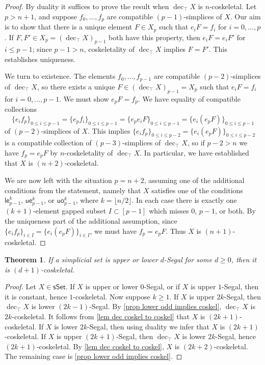 \documentclass{amsart}
\newcommand{\lowev}{\mathsf{le}}
\newcommand{\uppev}{\mathsf{ue}}
\newcommand{\uppod}{\mathsf{uo}}
\newcommand{\sset}{\mathsf{sSet}}
\newcommand{\dectop}{\operatorname{dec}_\top}
\newtheorem{theorem}{Theorem}
\theoremstyle{definition}
\theoremstyle{remark}
\begin{document}
\begin{proof}
By duality it suffices to prove the result when $\dectop X$ is $n$-coskeletal. 
Let $p > n+1$, and suppose $f_0, \dots, f_p$ are compatible $(p-1)$-simplices of $X$.
Our aim is to show that there is a unique element $F\in X_p$ such that $e_i F = f_i$ for $i=0,\dots, p$.
If $F,F' \in X_p = (\dectop X)_{p-1}$ both have this property, then $e_i F = e_i F'$ for $i \leq p-1$; since $p-1 > n$, coskeletality of $\dectop X$ implies $F = F'$. This establishes uniqueness.

We turn to existence.
The elements $f_0, \dots, f_{p-1}$ are compatible $(p{-}2)$-simplices of $\dectop X$, so there exists a unique $F \in (\dectop X)_{p-1} = X_p$ such that $e_i F = f_i$ for $i=0, \dots, p-1$.
We must show $e_p F = f_p$.
We have equality of compatible collections
\[
	\{ e_i f_p \}_{0 \leq i \leq p-1} = \{ e_p f_i \}_{0 \leq i \leq p-1} = \{ e_p e_i F \}_{0 \leq i \leq p-1} = \{ e_i (e_p F) \}_{0 \leq i \leq p-1}
\]
of $(p-2)$-simplices of $X$.
This implies $\{ e_i f_p \}_{0 \leq i \leq p-2} = \{ e_i (e_p F) \}_{0 \leq i \leq p-2}$ is a compatible collection of $(p-3)$-simplices of $\dectop X$, so if $p-2 > n$ we have $f_p = e_p F$ by $n$-coskeletality of $\dectop X$.
In particular, we have established that $X$ is $(n{+}2)$-coskeletal.

We are now left with the situation $p=n+2$, assuming one of the additional conditions from the statement, namely that $X$ satisfies one of the conditions $\lowev^k_{p-1}$, $\uppev^k_{p-1}$, or $\uppod^k_{p-1}$, where $k= \lfloor n/2 \rfloor$.
In each case there is exactly one $(k+1)$-element gapped subset $I\subset [p-1]$ which misses $0$,  $p-1$, or both.
By the uniqueness part of the additional assumption, since $\{ e_i f_p \}_{i\in I} = \{ e_i (e_p F) \}_{i\in I}$, we must have $f_p = e_p F$.
Thus $X$ is $(n{+}1)$-coskeletal.
\end{proof}


\begin{theorem}\label{hsc implies coskel}
If a simplicial set is upper or lower $d$-Segal for some $d\geq 0$, then it is $(d{+}1)$-coskeletal.
\end{theorem}
\begin{proof}
Let $X\in \sset$.
If $X$ is upper or lower $0$-Segal, or if $X$ is upper $1$-Segal, then it is constant, hence $1$-coskeletal.
Now suppose $k \geq 1$.
If $X$ is upper $2k$-Segal, then $\dectop X$ is lower $(2k{-}1)$-Segal.
By \cref{prop lower odd implies coskel}, $\dectop X$ is $2k$-coskeletal.
It follows from \cref{lem dec coskel to coskel} that $X$ is $(2k{+}1)$-coskeletal.
If $X$ is lower $2k$-Segal, then using duality we infer that $X$ is $(2k{+}1)$-coskeletal.
If $X$ is upper $(2k{+}1)$-Segal, then $\dectop X$ is lower $2k$-Segal, hence $(2k{+}1)$-coskeletal.
By \cref{lem dec coskel to coskel}, $X$ is $(2k{+}2)$-coskeletal.
The remaining case is \cref{prop lower odd implies coskel}.
\end{proof}
\end{document}
